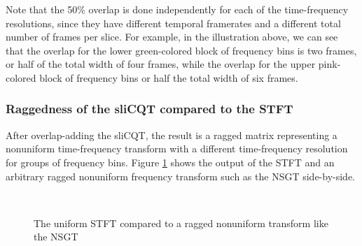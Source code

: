\documentclass[report.tex]{subfiles}
\begin{document}
Note that the 50\% overlap is done independently for each of the time-frequency resolutions, since they have different temporal framerates and a different total number of frames per slice. For example, in the illustration above, we can see that the overlap for the lower green-colored block of frequency bins is two frames, or half of the total width of four frames, while the overlap for the upper pink-colored block of frequency bins or half the total width of six frames.

\subsubsection{Raggedness of the sliCQT compared to the STFT}
\label{sec:stftslicqtcomp2}

After overlap-adding the sliCQT, the result is a ragged matrix representing a nonuniform time-frequency transform with a different time-frequency resolution for groups of frequency bins. Figure \ref{fig:contraststftslicqt} shows the output of the STFT and an arbitrary ragged nonuniform frequency transform such as the NSGT side-by-side.

\begin{figure}[ht]
	\centering
	\\
	\caption{The uniform STFT compared to a ragged nonuniform transform like the NSGT}
	\label{fig:contraststftslicqt}
\end{figure}
\end{document}
